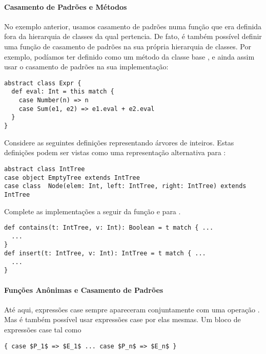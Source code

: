 \paragraph{Casamento de Padrões e Métodos}
No exemplo anterior, usamos casamento de padrões numa função que era definida fora da 
hierarquia de classes da qual pertencia. De fato, é também possível definir uma função 
de casamento de padrões na sua própria hierarquia de classes. Por exemplo, podíamos 
ter definido  como um método da classe base , e ainda assim usar o 
casamento de padrões na sua implementação:

\begin{lstlisting}
abstract class Expr { 
  def eval: Int = this match {
    case Number(n) => n
    case Sum(e1, e2) => e1.eval + e2.eval 
  } 
}
\end{lstlisting}

\begin{exercise} Considere as seguintes definições representando árvores de inteiros. 
Estas definições podem ser vistas como uma representação alternativa para : 

\begin{lstlisting}
abstract class IntTree
case object EmptyTree extends IntTree
case class  Node(elem: Int, left: IntTree, right: IntTree) extends IntTree
\end{lstlisting}


Complete as implementações a seguir da função  e  para 
.

\begin{lstlisting}
def contains(t: IntTree, v: Int): Boolean = t match { ...
  ...
}
def insert(t: IntTree, v: Int): IntTree = t match { ...
  ...
}
\end{lstlisting}
\end{exercise}


\paragraph{Funções Anônimas e Casamento de Padrões}

Até aqui, expressões case sempre apareceram conjuntamente com uma operação 
\verb@match@. Mas é também possível usar expressões case por elas mesmas. Um
bloco de expressões case tal como  


\begin{lstlisting}
{ case $P_1$ => $E_1$ ... case $P_n$ => $E_n$ }
\end{lstlisting}

